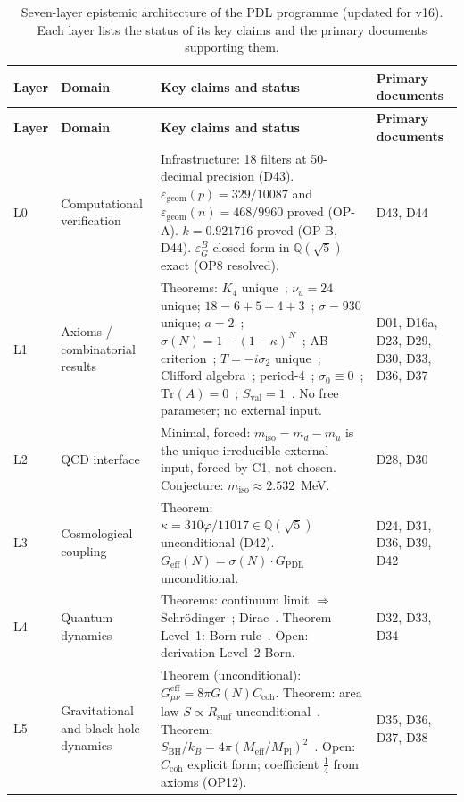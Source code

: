\documentclass[11pt,a4paper]{article}
\theoremstyle{plain}
\theoremstyle{definition}
\theoremstyle{remark}
\newcommand{\Geff}{G_{\mathrm{eff}}}
\newcommand{\GPDL}{G_{\mathrm{PDL}}}
\newcommand{\Rsurf}{R_{\mathrm{surf}}}
\newcommand{\sigmaN}{\sigma(N)}
\newcommand{\SBH}{S_{\mathrm{BH}}}
\newcommand{\Meff}{M_{\mathrm{eff}}}
\newcommand{\MPl}{M_{\mathrm{Pl}}}
\newcommand{\epsGeomB}{\varepsilon_G^B}
\begin{document}
\begin{longtable}{L{0.6cm}L{3.0cm}L{5.5cm}L{4.0cm}}
\caption{Seven-layer epistemic architecture of the PDL programme (updated for v16). Each layer lists the status of its key claims and the primary documents supporting them.}
\label{tab:epistemic}\\
\toprule
\textbf{Layer} & \textbf{Domain} & \textbf{Key claims and status} & \textbf{Primary documents}\\
\midrule
\endfirsthead
\toprule
\textbf{Layer} & \textbf{Domain} & \textbf{Key claims and status} & \textbf{Primary documents}\\
\midrule
\endhead
\bottomrule
\endfoot
L0 & Computational verification & \textcolor{proofblue}{Infrastructure}: 18 filters at 50-decimal precision (D43). $\varepsilon_{\mathrm{geom}}(p)=329/10087$ and $\varepsilon_{\mathrm{geom}}(n)=468/9960$ proved (OP-A). $k=0.921716$ proved (OP-B, D44). $\epsGeomB$ closed-form in $\mathbb{Q}(\sqrt{5})$ exact (OP8 resolved). & D43, D44\\[0.4em]
L1 & Axioms / combinatorial results & \textcolor{proofblue}{Theorems}: $K_4$ unique~\cite{D16a}; $\nu_u=24$ unique; $18=6+5+4+3$~\cite{D23}; $\sigma=930$ unique; $a=2$~\cite{D30}; $\sigmaN=1-(1-\kappa)^N$~\cite{D24}; AB criterion~\cite{D29}; $T=-i\sigma_2$ unique~\cite{D33}; Clifford algebra~\cite{D33}; period-4~\cite{D33}; $\sigma_0\equiv 0$~\cite{D36}; $\mathrm{Tr}(A)=0$~\cite{D36}; $S_{\mathrm{val}}=1$~\cite{D37}. No free parameter; no external input. & D01, D16a, D23, D29, D30, D33, D36, D37\\[0.4em]
L2 & QCD interface & Minimal, forced: $m_{\mathrm{iso}}=m_d-m_u$ is the unique irreducible external input, forced by C1, not chosen. \textcolor{conjecturegreen}{Conjecture}: $m_{\mathrm{iso}}\approx 2.532$~MeV. & D28, D30\\[0.4em]
L3 & Cosmological coupling & \textcolor{proofblue}{Theorem}: $\kappa=310\varphi/11017\in\mathbb{Q}(\sqrt{5})$ unconditional (D42). $\Geff(N)=\sigmaN\cdot\GPDL$ unconditional. & D24, D31, D36, D39, D42\\[0.4em]
L4 & Quantum dynamics & \textcolor{proofblue}{Theorems}: continuum limit $\Rightarrow$ Schr\"odinger~\cite{D32}; Dirac~\cite{D33}. \textcolor{proofblue}{Theorem} Level~1: Born rule~\cite{D34}. \textcolor{openproblemred}{Open}: derivation Level~2 Born. & D32, D33, D34\\[0.4em]
L5 & Gravitational and black hole dynamics & \textcolor{proofblue}{Theorem} (unconditional): $G_{\mu\nu}^{\mathrm{eff}}=8\pi G(N)C_{\mathrm{coh}}$. \textcolor{proofblue}{Theorem}: area law $S\propto\Rsurf$ unconditional~\cite{D37}. \textcolor{proofblue}{Theorem}: $\SBH/k_B=4\pi(\Meff/\MPl)^2$~\cite{D38}. \textcolor{openproblemred}{Open}: $C_{\mathrm{coh}}$ explicit form; coefficient $\tfrac{1}{4}$ from axioms (OP12). & D35, D36, D37, D38\\[0.4em]

\end{longtable}
\end{document}
